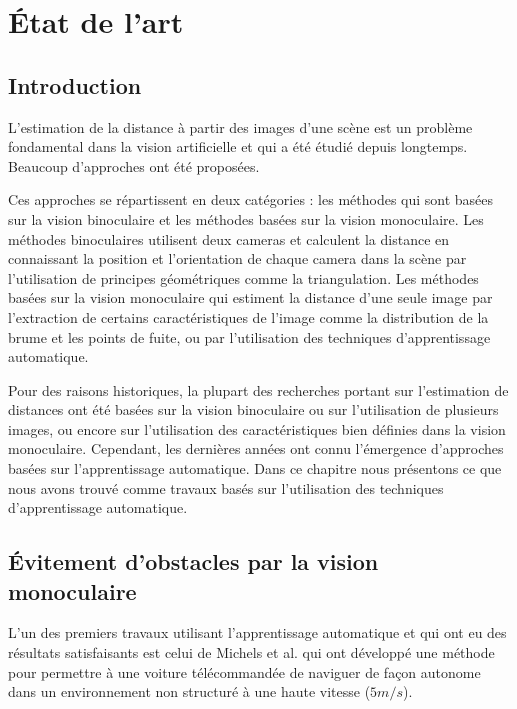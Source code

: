 \let\caption\oldcaption
\chapter{\'Etat de l'art}

\setcounter{chapter}{1} %

\section{Introduction}

L'estimation de la distance à partir des images d'une scène est un problème
fondamental dans la vision artificielle et qui a été étudié depuis longtemps.
Beaucoup d'approches ont été proposées.

Ces approches se répartissent en deux catégories : les méthodes qui sont basées
sur la vision binoculaire et les méthodes basées sur la vision monoculaire.
Les méthodes binoculaires utilisent deux cameras et calculent la distance
en connaissant la position et l'orientation de chaque camera dans la scène
par l'utilisation de principes géométriques comme la triangulation. Les
méthodes basées sur la vision monoculaire qui estiment la distance d'une seule
image par l'extraction de certains caractéristiques de l'image comme la
distribution de la brume et les points de fuite, ou par l'utilisation des
techniques d'apprentissage automatique.

Pour des raisons historiques, la plupart des recherches portant sur l'estimation
de distances ont été basées sur la vision binoculaire ou sur l'utilisation de
plusieurs images, ou encore sur l'utilisation des caractéristiques bien définies
dans la vision monoculaire. Cependant, les dernières années ont connu
l'émergence d'approches basées sur l'apprentissage automatique.
Dans ce chapitre nous présentons ce que nous avons trouvé comme travaux basés
sur l'utilisation des techniques d'apprentissage automatique.

\section{\'Evitement d'obstacles par la vision monoculaire}

L'un des premiers travaux utilisant l'apprentissage automatique et qui ont eu
des résultats satisfaisants est celui de Michels et al.\cite{michels2005high}
qui ont développé une méthode pour permettre à une voiture télécommandée de
naviguer de façon autonome dans un environnement non structuré à une haute
vitesse ($5m/s$).


